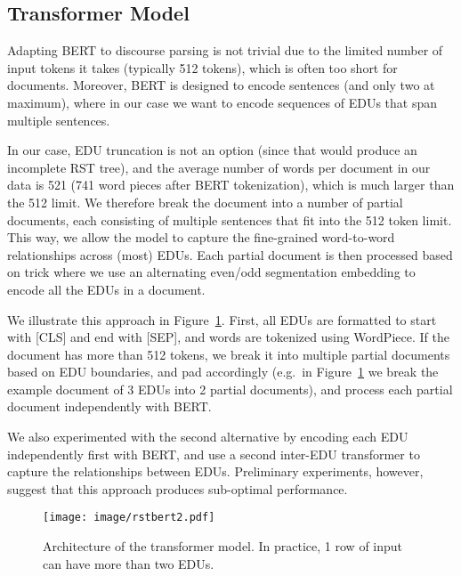 \documentclass[11pt,a4paper]{article}
\newcommand{\figref}[2][]{Figure#1~\ref{fig:#2}}
\begin{document}
\subsection{Transformer Model}
\label{sec:transformer}

Adapting BERT to discourse parsing is not
trivial due to the limited number of input tokens it takes (typically
512 tokens), which is often too short for documents. Moreover, BERT is
designed to encode sentences (and only two at maximum), where in our
case we want to encode sequences of EDUs that span multiple
sentences.

In our case, EDU truncation is not an option (since that would produce an
incomplete RST tree), and the average number  of words per document in our data is 521 (741 word pieces after BERT tokenization), which is much larger than the 512 limit. We therefore break the document into a number of partial documents, each consisting of multiple sentences that fit into the 512 token limit. This way, we allow the model to capture the fine-grained
word-to-word relationships across (most) EDUs. Each partial document is then processed 
based on \citet{liu2019text} trick where we use an alternating even/odd segmentation embedding to encode all the EDUs in a document.

We illustrate this approach in \figref{rstbert}. First, all EDUs are
formatted to start with [CLS] and end with [SEP], and words are
tokenized using WordPiece. If the document has more than 512 tokens, we
break it into multiple partial documents based on EDU boundaries,
and pad accordingly (e.g.\ in \figref{rstbert} we break the example
document of 3 EDUs into 2 partial documents), and process each partial
document independently with BERT.

We also experimented with the second alternative by 
encoding each EDU independently first with BERT, and use a
second inter-EDU transformer to capture the relationships between EDUs.
Preliminary experiments, however, suggest that this approach produces
sub-optimal performance. 




\begin{figure}
	\centering
	\texttt{[image: image/rstbert2.pdf]}
    \caption{Architecture of the transformer model. In practice, 1 row of input can have more than two EDUs. }
    \label{fig:rstbert}
\end{figure}
\end{document}

